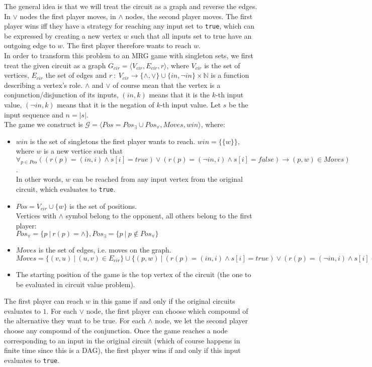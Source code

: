 \noindent
The general idea is that we will treat the circuit as a graph and reverse the edges. In $\lor$ nodes the first
player moves, in $\land$ nodes, the second player moves. The first player wins iff they have a strategy for
reaching any input set to \texttt{true}, which can be expressed by creating a new vertex $w$ such that all inputs
set to true have an outgoing edge to $w$. The first player therefore wants to reach $w$.\\

\noindent
In order to transform this problem to an MRG game with singleton sets, we first treat the given circuit as a
graph $G_{cir} = \langle V_{cir}, E_{cir}, r \rangle$, where $V_{cir}$ is the set of vertices, $E_{cir}$ the
set of edges and $r\ :\ V_{cir} \rightarrow \{ \land, \lor \} \cup \{in, \lnot in\} \times \mathbb{N}$
is a function describing a vertex's role. $\land$ and $\lor$ of course mean that the vertex is a conjunction/disjunction
of its inputs, $(in, k)$ means that it is the $k$-th input value, $(\lnot in, k)$ means that it is the negation
of $k$-th input value. Let $s$ be the input sequence and $n = |s|$.\\

\noindent
The game we construct is $\mathcal{G} = \langle Pos = Pos_{\exists} \cup Pos_{\forall}, Moves, win \rangle$, where:
\begin{itemize}
      \item $win$ is the set of singletons the first player wants to reach.
            $win = \{\{ w \}\}$, where $w$ is a new vertice such that\\
            $\forall_{p \in Pos} ((r(p) = (in,i) \land s[i] = true) \lor (r(p) = (\lnot in,i) \land s[i] = false) \rightarrow (p, w) \in Moves)$.\\
            In other words, $w$ can be reached from any input vertex from the original circuit, which evaluates to \texttt{true}.
      \item $Pos = V_{cir} \cup \{w\}$ is the set of positions.\\
            Vertices with $\land$ symbol belong to the opponent, all others belong to the first player:\\
            $Pos_{\forall} = \{p\ |\ r(p) = \land\}, Pos_{\exists} = \{p\ |\ p \not\in Pos_{\forall}\}$
      \item $Moves$ is the set of edges, i.e. moves on the graph.\\
            $Moves = \{(v,u)\ |\ (u,v) \in E_{cir}\} \cup \{(p,w)\ |\ (r(p) = (in,i) \land s[i] = true) \lor (r(p) = (\lnot in,i) \land s[i] = false)\}$
      \item The starting position of the game is the top vertex of the circuit (the one to be evaluated in circuit value problem).
\end{itemize}
The first player can reach $w$ in this game if and only if the original circuits evaluates to $1$.
For each $\lor$ node, the first player can choose which compound of the alternative they want to be true.
For each $\land$ node, we let the second player choose any compound of the conjunction. Once the game
reaches a node corresponding to an input in the original circuit (which of course happens in finite time
since this is a DAG), the first player wins if and only if this input evaluates to \texttt{true}.